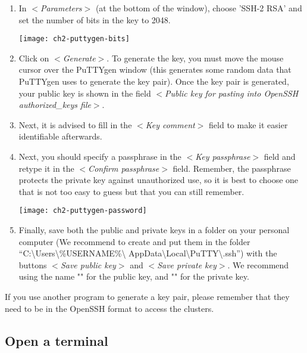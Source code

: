   \begin{enumerate}
    \item  In $<$\emph{Parameters}$>$ (at the bottom of the window), choose
      'SSH-2 RSA' and set the number of bits in the key to 2048.

    \texttt{[image: ch2-puttygen-bits]}

    \item  Click on $<$\emph{Generate}$>$. To generate the key, you must move
      the mouse cursor over the PuTTYgen window (this generates some random
      data that PuTTYgen uses to generate the key pair). Once the key pair is
      generated, your public key is shown in the field $<$\emph{Public key for pasting into OpenSSH authorized\_keys file}$>$.
    \item  Next, it is advised to fill in the $<$\emph{Key comment}$>$ field
      to make it easier identifiable afterwards.
    \item  Next, you should specify a passphrase in the $<$\emph{Key passphrase}$>$
      field and retype it in the $<$\emph{Confirm passphrase}$>$ field.
      Remember, the passphrase protects the private key against unauthorized
      use, so it is best to choose one that is not too easy to guess but that
      you can still remember.

    \texttt{[image: ch2-puttygen-password]}

    \item  Finally, save both the public and private keys in a folder on your
      personal computer (We recommend to create and put them in the folder
      ``C:\textbackslash Users\textbackslash \%USERNAME\%\textbackslash
      AppData\textbackslash Local\textbackslash PuTTY\textbackslash .ssh'')
      with the buttons $<$\emph{Save public key}$>$ and $<$\emph{Save private key}$>$.
      We recommend using the name "" for the public key,
      and "" for the private key.
  \end{enumerate}

  If you use another program to generate a key pair, please remember that they
  need to be in the OpenSSH format to access the \hpc clusters.

\fi


\ifmac

  \subsection{Open a terminal}
  \label{sec:open-a-terminal}


